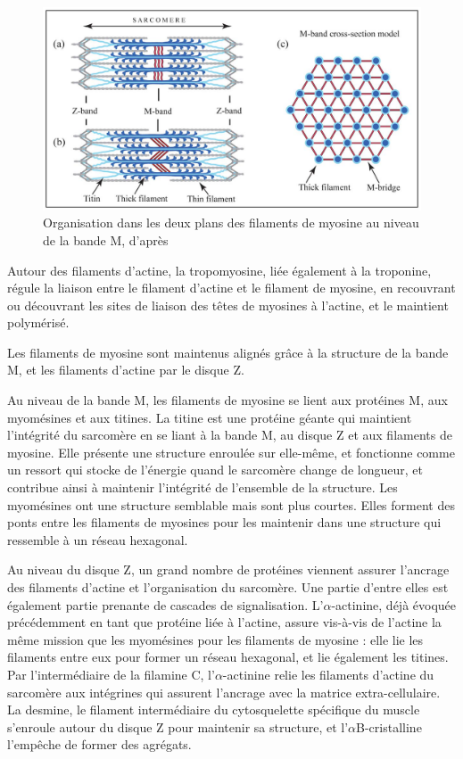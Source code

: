 \begin{figure}
\includegraphics[scale=0.4]{Figures/Myomesine.png}
\caption{Organisation dans les deux plans des filaments de myosine au niveau de la bande M, d'après \cite{tskhovrebova_making_2012}}
\end{figure}
 
Autour des filaments d'actine, la tropomyosine, liée également à la troponine, régule la liaison entre le filament d'actine et le filament de myosine, en recouvrant ou découvrant les sites de liaison des têtes de myosines à l'actine, et le maintient polymérisé. 

Les filaments de myosine sont maintenus alignés grâce à la structure de la bande M, et les filaments d'actine par le disque Z. 

Au niveau de la bande M, les filaments de myosine se lient aux protéines M, aux myomésines et aux titines. 
La titine est une protéine géante qui maintient l'intégrité du sarcomère en se liant à la bande M, au disque Z et aux filaments de myosine. Elle présente une structure enroulée sur elle-même, et fonctionne comme un ressort qui stocke de l'énergie quand le sarcomère change de longueur, et contribue ainsi à maintenir l'intégrité de l'ensemble de la structure. 
Les myomésines ont une structure semblable mais sont plus courtes. Elles forment des ponts entre les filaments de myosines pour les maintenir dans une structure qui ressemble à un réseau hexagonal. 

Au niveau du disque Z, un grand nombre de protéines viennent assurer l'ancrage des filaments d'actine et l'organisation du sarcomère. Une partie d'entre elles est également partie prenante de cascades de signalisation.
L'$\alpha$-actinine, déjà évoquée précédemment en tant que protéine liée à l'actine, assure vis-à-vis de l'actine la même mission que les myomésines pour les filaments de myosine : elle lie les filaments entre eux pour former un réseau hexagonal, et lie également les titines. 
Par l'intermédiaire de la filamine C, l'$\alpha$-actinine relie les filaments d'actine du sarcomère aux intégrines qui assurent l'ancrage avec la matrice extra-cellulaire. 
La desmine, le filament intermédiaire du cytosquelette spécifique du muscle s'enroule autour du disque Z pour maintenir sa structure, et l'$\alpha$B-cristalline l'empêche de former des agrégats. 


